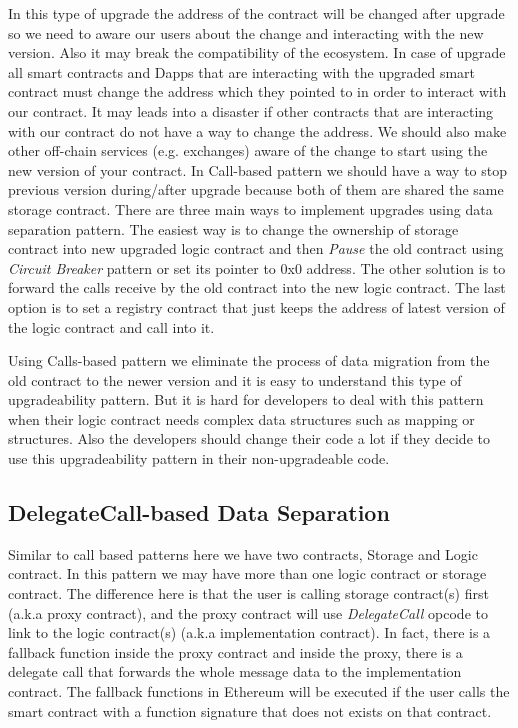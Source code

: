 In this type of upgrade the address of the contract will be changed after upgrade so we need to aware our users about the change and interacting with the new version. Also it may break the compatibility of the ecosystem. In case of upgrade all smart contracts and Dapps that are interacting with the upgraded smart contract must change the address which they pointed to in order to interact with our contract. It may leads into a disaster if other contracts that are interacting with our contract do not have a way to change the address. We should also make other off-chain services (e.g. exchanges) aware of the change to start using the new version of your contract. In Call-based pattern we should have a way to stop previous version during/after upgrade because both of them are shared the same storage contract. 
There are three main ways to implement upgrades using data separation pattern. The easiest way is to change the ownership of storage contract into new upgraded logic contract and then \textit{Pause} the old contract using \textit{Circuit Breaker} pattern or set its pointer to 0x0 address. The other solution is to forward the calls receive by the old contract into the new logic contract. The last option is to set a registry contract that just keeps the address of latest version of the logic contract and call into it.


Using Calls-based pattern we eliminate the process of data migration from the old contract to the newer version and it is easy to understand this type of upgradeability pattern. But it is hard for developers to deal with this pattern when their logic contract needs complex data structures such as mapping or structures. Also the developers should change their code a lot if they decide to use this upgradeability pattern in their non-upgradeable code. 


\subsection{DelegateCall-based Data Separation}

Similar to call based patterns here we have two contracts, Storage and Logic contract. In this pattern we may have more than one logic contract or storage contract. The difference here is that the user is calling storage contract(s) first (a.k.a proxy contract), and the proxy contract will use \textit{DelegateCall} opcode to link to the logic contract(s) (a.k.a implementation contract). In fact, there is a fallback function inside the proxy contract and inside the proxy, there is a delegate call that forwards the whole message data to the implementation contract.
The fallback functions in Ethereum will be executed if the user calls the smart contract with a function signature that does not exists on that contract.

